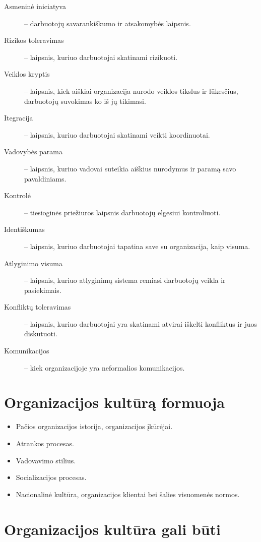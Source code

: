 \begin{description}
  \item[Asmeninė iniciatyva] – darbuotojų savarankiškumo ir atsakomybės
    laipsnis.
  \item[Rizikos toleravimas] – laipsnis, kuriuo darbuotojai skatinami
    rizikuoti.
  \item[Veiklos kryptis] – laipsnis, kiek aiškiai organizacija nurodo
    veiklos tikslus ir lūkesčius, darbuotojų suvokimas ko iš jų tikimasi.
  \item[Itegracija] – laipsnis, kuriuo darbuotojai skatinami veikti
    koordinuotai.
  \item[Vadovybės parama] – laipsnis, kuriuo vadovai suteikia aiškius
    nurodymus ir paramą savo pavaldiniams.
  \item[Kontrolė] – tiesioginės priežiūros laipsnis darbuotojų elgesiui
    kontroliuoti.
  \item[Identiškumas] – laipsnis, kuriuo darbuotojai tapatina save su
    organizacija, kaip visuma.
  \item[Atlyginimo visuma] – laipsnis, kuriuo atlyginimų sistema remiasi
    darbuotojų veikla ir pasiekimais.
  \item[Konfliktų toleravimas] – laipsnis, kuriuo darbuotojai yra skatinami
    atvirai iškelti konfliktus ir juos diskutuoti.
  \item[Komunikacijos] – kiek organizacijoje yra neformalios komunikacijos.
\end{description}

\section{Organizacijos kultūrą formuoja}

\begin{itemize}
  \item Pačios organizacijos istorija, organizacijos įkūrėjai.
  \item Atrankos procesas.
  \item Vadovavimo stilius.
  \item Socializacijos procesas.
  \item Nacionalinė kultūra, organizacijos klientai bei šalies visuomenės
    normos.
\end{itemize}

\section{Organizacijos kultūra gali būti}

